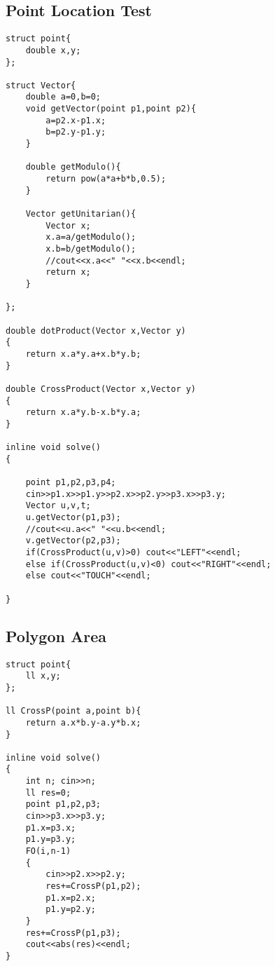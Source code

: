 \documentclass{article}
\begin{document}
\subsection{Point Location Test}
\begin{lstlisting}
struct point{
    double x,y;
};

struct Vector{
    double a=0,b=0;
    void getVector(point p1,point p2){
        a=p2.x-p1.x;
        b=p2.y-p1.y;
    }

    double getModulo(){
        return pow(a*a+b*b,0.5);
    }

    Vector getUnitarian(){
        Vector x;
        x.a=a/getModulo();
        x.b=b/getModulo();
        //cout<<x.a<<" "<<x.b<<endl;
        return x;
    }

};

double dotProduct(Vector x,Vector y)
{
    return x.a*y.a+x.b*y.b;
}

double CrossProduct(Vector x,Vector y)
{
    return x.a*y.b-x.b*y.a;
}

inline void solve()
{
    
    point p1,p2,p3,p4;
    cin>>p1.x>>p1.y>>p2.x>>p2.y>>p3.x>>p3.y;
    Vector u,v,t;
    u.getVector(p1,p3);
    //cout<<u.a<<" "<<u.b<<endl;
    v.getVector(p2,p3);
    if(CrossProduct(u,v)>0) cout<<"LEFT"<<endl;
    else if(CrossProduct(u,v)<0) cout<<"RIGHT"<<endl;
    else cout<<"TOUCH"<<endl;
    
}

\end{lstlisting}
\subsection{Polygon Area}
\begin{lstlisting}
struct point{
    ll x,y;
};

ll CrossP(point a,point b){
    return a.x*b.y-a.y*b.x;
}

inline void solve()
{
    int n; cin>>n;
    ll res=0;
    point p1,p2,p3;
    cin>>p3.x>>p3.y;
    p1.x=p3.x;
    p1.y=p3.y;
    FO(i,n-1)
    {
        cin>>p2.x>>p2.y;
        res+=CrossP(p1,p2);
        p1.x=p2.x;
        p1.y=p2.y;
    }
    res+=CrossP(p1,p3);
    cout<<abs(res)<<endl;
}
\end{lstlisting}
\end{document}
